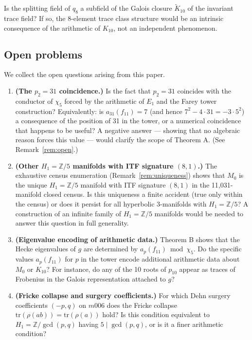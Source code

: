 \begin{question}
Is the splitting field of $q_8$ a subfield of the Galois closure
$\widetilde{K}_{10}$ of the invariant trace field? If so, the 8-element
trace class structure would be an intrinsic consequence of the arithmetic
of $K_{10}$, not an independent phenomenon.
\end{question}

\subsection{Open problems}

We collect the open questions arising from this paper.

\begin{enumerate}[(1)]

\item \textbf{(The $p_2 = 31$ coincidence.)}
Is the fact that $p_2 = 31$ coincides with the conductor of $\chi_5$
forced by the arithmetic of $E_1$ and the Farey tower construction?
Equivalently: is $a_{31}(f_{11}) = 7$ (and hence $7^2 - 4\cdot 31 = -3\cdot 5^2$)
a consequence of the position of 31 in the tower, or a numerical coincidence
that happens to be useful? A negative answer — showing that no algebraic
reason forces this value — would clarify the scope of Theorem A.
(See Remark~\ref{rem:open}.)

\item \textbf{(Other $H_1 = \mathbb{Z}/5$ manifolds with ITF signature $(8,1)$.)}
The exhaustive census enumeration (Remark~\ref{rem:uniqueness}) shows that
$M_0$ is the unique $H_1 = \mathbb{Z}/5$ manifold with ITF signature $(8,1)$
in the 11,031-manifold closed census. Is this uniqueness a finite accident
(true only within the census) or does it persist for all hyperbolic
3-manifolds with $H_1 = \mathbb{Z}/5$?
A construction of an infinite family of $H_1 = \mathbb{Z}/5$ manifolds would
be needed to answer this question in full generality.

\item \textbf{(Eigenvalue encoding of arithmetic data.)}
Theorem B shows that the Hecke eigenvalues of $g$ are determined by
$a_p(f_{11}) \bmod \chi_5$. Do the specific values $a_p(f_{11})$ for
$p$ in the tower encode additional arithmetic data about $M_0$ or $K_{10}$?
For instance, do any of the 10 roots of $p_{10}$ appear as traces of
Frobenius in the Galois representation attached to $g$?

\item \textbf{(Fricke collapse and surgery coefficients.)}
For which Dehn surgery coefficients $(-p, q)$ on $m006$ does the
Fricke collapse $\mathrm{tr}(\rho(ab)) = \mathrm{tr}(\rho(a))$ hold?
Is this condition equivalent to $H_1 = \mathbb{Z}/\gcd(p, q)$ having
$5 \mid \gcd(p, q)$, or is it a finer arithmetic condition?


\end{enumerate}
